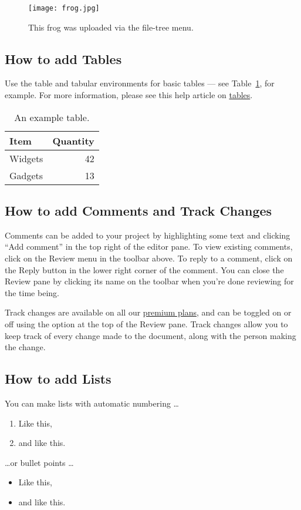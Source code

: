\documentclass{article}
\begin{document}
\begin{figure}
\centering
\texttt{[image: frog.jpg]}
\caption{\label{fig:frog}This frog was uploaded via the file-tree menu.}
\end{figure}

\subsection{How to add Tables}

Use the table and tabular environments for basic tables --- see Table~\ref{tab:widgets}, for example. For more information, please see this help article on \href{https://www.overleaf.com/learn/latex/tables}{tables}. 

\begin{table}
\centering
\begin{tabular}{l|r}
Item & Quantity \\\hline
Widgets & 42 \\
Gadgets & 13
\end{tabular}
\caption{\label{tab:widgets}An example table.}
\end{table}

\subsection{How to add Comments and Track Changes}

Comments can be added to your project by highlighting some text and clicking ``Add comment'' in the top right of the editor pane. To view existing comments, click on the Review menu in the toolbar above. To reply to a comment, click on the Reply button in the lower right corner of the comment. You can close the Review pane by clicking its name on the toolbar when you're done reviewing for the time being.

Track changes are available on all our \href{https://www.overleaf.com/user/subscription/plans}{premium plans}, and can be toggled on or off using the option at the top of the Review pane. Track changes allow you to keep track of every change made to the document, along with the person making the change. 

\subsection{How to add Lists}

You can make lists with automatic numbering \dots

\begin{enumerate}
\item Like this,
\item and like this.
\end{enumerate}
\dots or bullet points \dots
\begin{itemize}
\item Like this,
\item and like this.
\end{itemize}
\end{document}
